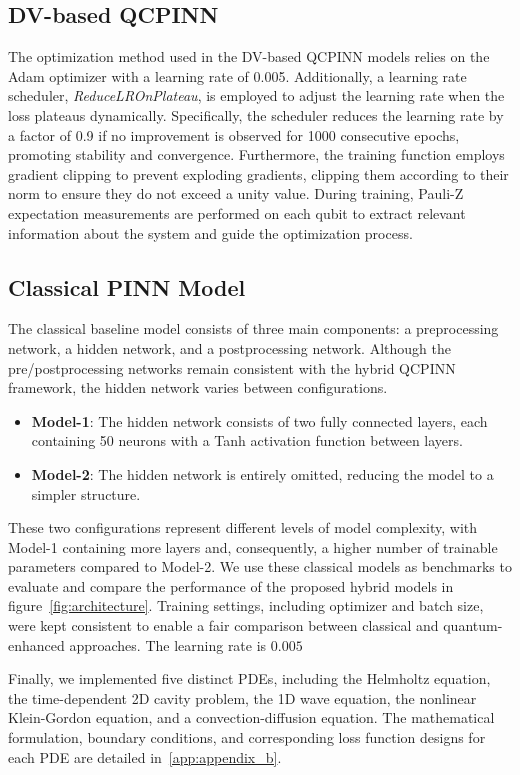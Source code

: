\subsection{DV-based QCPINN}

The optimization method used in the DV-based QCPINN models relies on the Adam optimizer with a learning rate of 0.005. Additionally, a learning rate scheduler, \textit{ReduceLROnPlateau}, is employed to adjust the learning rate when the loss plateaus dynamically. Specifically, the scheduler reduces the learning rate by a factor of 0.9 if no improvement is observed for 1000 consecutive epochs, promoting stability and convergence. Furthermore, the training function employs gradient clipping to prevent exploding gradients, clipping them according to their norm to ensure they do not exceed a unity value. During training, Pauli-Z expectation measurements are performed on each qubit to extract relevant information about the system and guide the optimization process.




\subsection{Classical PINN Model}

The classical baseline model consists of three main components: a preprocessing network, a hidden network, and a postprocessing network. Although the pre/postprocessing networks remain consistent with the hybrid QCPINN framework, the hidden network varies between configurations.
    \begin{itemize}
        \item \textbf{Model-1}: The hidden network consists of two fully connected layers, each containing 50 neurons with a Tanh activation function between layers.
        \item \textbf{Model-2}: The hidden network is entirely omitted, reducing the model to a simpler structure.
    \end{itemize}
    
These two configurations represent different levels of model complexity, with Model-1 containing more layers and, consequently, a higher number of trainable parameters compared to Model-2. We use these classical models as benchmarks to evaluate and compare the performance of the proposed hybrid models in figure~\ref{fig:architecture}. Training settings, including optimizer and batch size, were kept consistent to enable a fair comparison between classical and quantum-enhanced approaches. The learning rate is $0.005$


Finally, we implemented five distinct PDEs, including the Helmholtz equation, the time-dependent 2D cavity problem, the 1D wave equation, the nonlinear Klein-Gordon equation, and a convection-diffusion equation. The mathematical formulation, boundary conditions, and corresponding loss function designs for each PDE are detailed in~\ref{app:appendix_b}.

    

